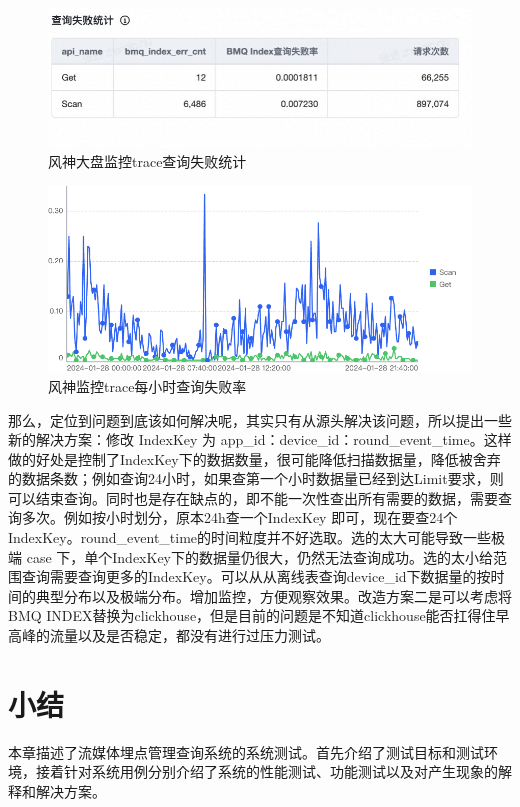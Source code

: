 \begin{longtable}[htbp]
\begin{figure}[htbp]
  \centering
  \includegraphics[width=5in]{figure/chapter6/风神大盘监控trace查询失败统计.jpg}
  \caption{风神大盘监控trace查询失败统计}\label{fengshenMonitorTrace}
\end{figure}

\begin{figure}[htbp]
  \centering
  \includegraphics[width=5in]{figure/chapter6/风神监控trace每小时查询失败率.png}
  \caption{风神监控trace每小时查询失败率}\label{fengshenMonitorTracePreHour}
\end{figure}

那么，定位到问题到底该如何解决呢，其实只有从源头解决该问题，所以提出一些新的解决方案：修改 IndexKey 为 app\_id：device\_id：round\_event\_time。这样做的好处是控制了IndexKey下的数据数量，很可能降低扫描数据量，降低被舍弃的数据条数；例如查询24小时，如果查第一个小时数据量已经到达Limit要求，则可以结束查询。同时也是存在缺点的，即不能一次性查出所有需要的数据，需要查询多次。例如按小时划分，原本24h查一个IndexKey 即可，现在要查24个 IndexKey。round\_event\_time的时间粒度并不好选取。选的太大可能导致一些极端 case 下，单个IndexKey下的数据量仍很大，仍然无法查询成功。选的太小给范围查询需要查询更多的IndexKey。可以从从离线表查询device\_id下数据量的按时间的典型分布以及极端分布。增加监控，方便观察效果。改造方案二是可以考虑将BMQ INDEX替换为clickhouse，但是目前的问题是不知道clickhouse能否扛得住早高峰的流量以及是否稳定，都没有进行过压力测试。

\section{小结}
本章描述了流媒体埋点管理查询系统的系统测试。首先介绍了测试目标和测试环境，接着针对系统用例分别介绍了系统的性能测试、功能测试以及对产生现象的解释和解决方案。 


\end{longtable}
